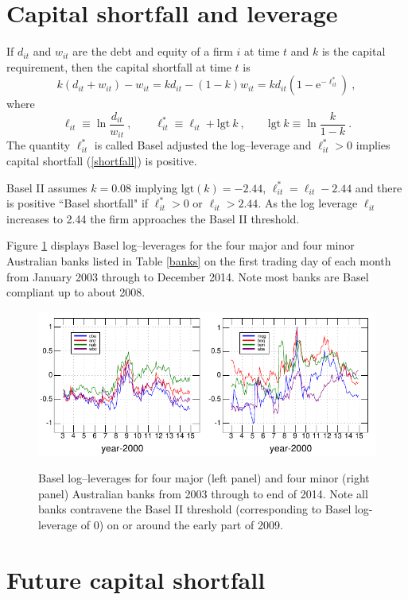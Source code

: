 \documentclass[authoryear]{elsarticle}
\newcommand{\logit}{\mathrm{lgt}}
\newcommand{\e}{\mathrm{e}}
\newcommand{\eref}[1]{(\ref{#1})}
\newcommand{\fref}[1]{Figure \ref{#1}}
\newcommand{\tref}[1]{Table \ref{#1}}
\newcommand{\cq}{\ , \qquad}
\newcommand{\be}[1]{\begin{equation}\label{#1}}
\newcommand{\ee}{\end{equation}}
\begin{document}
\section{Capital shortfall and leverage}

If $d_{it}$ and $w_{it}$ are the debt and equity of a firm $i$ at time $t$ and $k$ is the capital requirement,  then the capital shortfall at time $t$ is 
\be{shortfall}
k(d_{it}+w_{it}) - w_{it} = kd_{it}  - (1-k) w_{it} = kd_{it}\left(1-\e^{-\ell^*_{it}}\right)\ ,
\ee
where 
$$
\ell_{it} \equiv \ln\frac{d_{it}}{w_{it}}\cq \ell_{it}^* \equiv \ell_{it} + \logit\ k \cq \logit\ k\equiv \ln \frac{k}{1-k} \ .
$$
The quantity $\ell^*_{it}$ is called Basel adjusted the log--leverage and $\ell^*_{it}>0$ implies capital shortfall \eref{shortfall} is positive. 


Basel II assumes $k=0.08$ implying $\logit(k)=-2.44$,  $\ell_{it}^*=\ell_{it}-2.44$  and there is  positive  ``Basel shortfall"  if
$\ell^*_{it}>0$ or $\ell_{it} > 2.44$.
As the log leverage $\ell_{it}$  increases to 2.44 the firm approaches the Basel II threshold. 

\fref{Bloglev} displays Basel log--leverages for the four major and four minor Australian banks listed in \tref{banks} on the first trading day of each month from January 2003  through to December 2014.  Note most banks are Basel compliant up to about 2008.

\begin{figure}[htbp]
\begin{center}
\label{Bloglev}
\includegraphics{Bloglev.pdf}
\caption{Basel log--leverages for four major (left panel) and four minor (right panel) Australian banks from 2003 through to end of 2014.  Note all banks contravene the Basel II threshold (corresponding to Basel log-leverage of 0) on or around the early part of 2009.}
\end{center}
\end{figure}


\section{Future capital shortfall}
\end{document}
